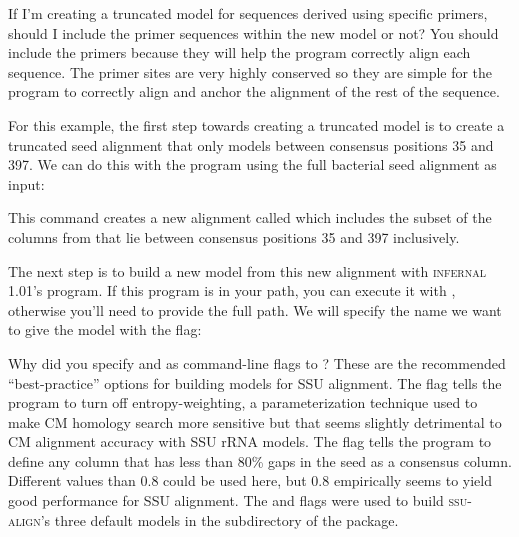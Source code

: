 \begin{srefaq}{If I'm creating a truncated model for sequences derived
    using specific primers, should I include the primer sequences
    within the new model or not?} You should include the primers
  because they will help the program correctly align each
  sequence. The primer sites are very highly conserved so they are
  simple for the program to correctly align and anchor the alignment
  of the rest of the sequence.
\end{srefaq}

For this example, the first step towards creating a truncated model is
to create a truncated seed alignment that only models between
consensus positions 35 and 397. We can do this with the
 program using the full bacterial seed alignment as
input:


This command creates a new alignment called  which
includes the subset of the columns from  that lie
between consensus positions 35 and 397 inclusively.

The next step is to build a new model from this new alignment with
\textsc{infernal} 1.01's  program. If this program is in
your path, you can execute it with , otherwise you'll
need to provide the full path. We will specify the name we want
to give the model with the  flag:


\begin{srefaq}{Why did you specify  and
     as command-line flags to ?}
    These are the recommended ``best-practice'' options for building
    models for SSU alignment. The  flag tells the
    program to turn off entropy-weighting, a parameterization
    technique used to make CM homology search more sensitive
    \cite{Nawrocki07} but that seems slightly detrimental to CM
    alignment accuracy with SSU rRNA models. The  flag tells the program to define any column that has less
    than 80\% gaps in the seed as a consensus column. Different values
    than 0.8 could be used here, but 0.8 empirically seems to yield
    good performance for SSU alignment. The  and
     flags were used to build
    \textsc{ssu-align}'s three default models in the 
    subdirectory of the package.
\end{srefaq}

